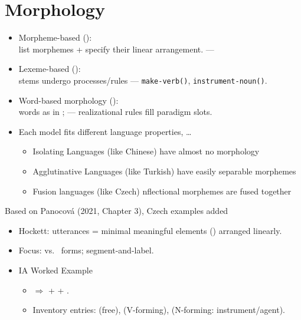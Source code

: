 \documentclass[a4paper,landscape,headrule,footrule]{foils}
\begin{document}
\section{Morphology}

\begin{itemize}
\item Morpheme-based (): \\ list morphemes + specify their linear arrangement.
  ---  
\item Lexeme-based (): \\ stems undergo processes/rules
  --- \texttt{make-verb()}, \texttt{instrument-noun()}. 
\item Word-based morphology (): \\ words as  in ;
  --- realizational rules fill paradigm slots. 
\item Each model fits different language properties, \ldots
  \begin{itemize}
  \item Isolating Languages (like Chinese) have almost no morphology
  \item Agglutinative Languages (like Turkish) have easily separable morphemes
  \item Fusion languages (like Czech) nflectional morphemes are fused together
  \end{itemize}
 \end{itemize}

Based on Panocová (2021, Chapter 3), Czech examples added

\begin{itemize}
  \item Hockett: utterances = minimal meaningful elements () arranged linearly.
  \item Focus:  vs.\  forms; segment-and-label.
  \item IA Worked Example
    \begin{itemize}
    \item {} $\Rightarrow$  +  + .
    \item Inventory entries:  (free),  (V-forming),  (N-forming: instrument/agent).
    \end{itemize}
  \end{itemize}
  
\end{document}
